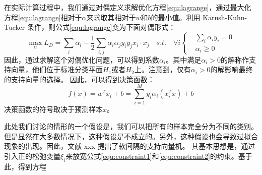 在实际计算过程中，我们通过对偶定义求解优化方程\ref{equ:lagrange}，通过最大化方程\ref{equ:lagrange}相对于$\alpha$来求取其相对于$w$和$b$的最小值。利用 Karush-Kuhn-Tucker 条件，则公式\ref{equ:lagrange}变为下面对偶形式：
\begin{equation}
	\max \limits_{\alpha} L_D=\sum_i{\alpha_i}-\frac{1}{2}\sum_{i,j}\alpha_i\alpha_jy_iy_jx_i\cdot x_j \quad s.t. \quad \forall i 
	\left\{
		\begin{aligned}
	   &\sum_i{\alpha_iy_i}=0  \\
	   &\alpha_i \geq 0
	   \end{aligned}
		\right.
\end{equation}
因此，通过求解这个对偶优化问题，可以得到系数$\alpha_i$。其中满足$\alpha_i>0$的解称作支持向量，他们位于标准分类平面$H_1$或者$H_2$上。注意到，仅有$\alpha_i>0$的解影响最终的支持向量的选择。
因此，可以得到决策函数：
\begin{equation}
	f(x)=w^Tx_i+b=\sum_{i=1}^My_i\alpha_i(x_i^Tx)+b
\end{equation}
决策函数的符号取决于预测样本$x$。

此处我们讨论的情形的一个假设是，我们可以把所有的样本完全分为不同的类别。但是显然在大多数情况下，这种假设是不成立的。另外，这种假设也会导致过拟合现象的出现。因此，文献 xxx 提出了软间隔的支持向量机。
其基本思想是，通过引入正的松弛变量$\xi_i$来放宽公式\ref{equ:constraint1}和\ref{equ:constraint2}的约束。基于此，得到方程

